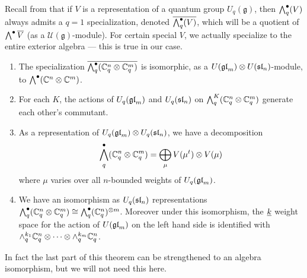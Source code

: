 \documentclass[11pt,leqno]{article}
\begin{document}
Recall from \cite{BZ} that if $ V $ is a representation of a quantum group $ U_q(\mathfrak{g}) $, then $ \Alt^\bullet_q(V) $ always admits a $ q=1 $ specialization, denoted $ \overline{\Alt^\bullet_q(V)}$, which will be a quotient of $ \Alt^\bullet \overline{V} $ (as a $\mathcal{U}(\mathfrak{g})$-module). For certain special $ V $, we actually specialize to the entire exterior algebra --- this is true in our case.

\begin{thm} \label{th:qSkewHowe}\mbox{}
\begin{enumerate}
\item The specialization $\overline{\Alt^\bullet_q(\bC_q^n \otimes \bC_q^m)} $ is isomorphic, as a $U(\gl_m) \otimes U(\sl_n)$-module, to $ \Alt^\bullet(\bC^n \otimes \bC^m) $.
\item For each $ K $, the actions of $ U_q(\gl_m) $ and $ U_q(\sl_n) $ on $ \Alt^K_q(\bC_q^n \otimes \bC_q^m) $ generate each other's commutant.
\item As a representation of $ U_q(\gl_m) \otimes U_q(\sl_n)  $, we have a decomposition
$$ \Alt^\bullet_q (\mathbb C^n_q \otimes \mathbb C^m_q) = \bigoplus_{\mu} V(\mu^t) \otimes V(\mu) $$
 where $\mu$ varies over all $n$-bounded weights of $ U_q(\gl_m)$.
\item We have an isomorphism as $ U_q(\sl_n) $ representations 
$ \Alt^\bullet_q(\mathbb C^n_q \otimes \mathbb C^m_q) \cong \Alt^\bullet_q(\bC_q^n)^{\otimes m} $.  Moreover under this isomorphism, the $ \ul{k} $ weight space for the action of $ U(\gl_m) $ on the left hand side is identified with $\alt^{k_1}_q \mathbb C_q^n \otimes \cdots \otimes \alt^{k_m}_q \mathbb C_q^n$.
\end{enumerate}
\end{thm}

In fact the last part of this theorem can be strengthened to an algebra isomorphism, but we will not need this here.
\end{document}
